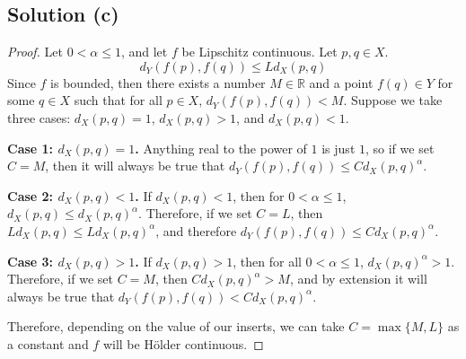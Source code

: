 \documentclass[11pt]{article}
\begin{document}
    \subsection{Solution (c)}
        \begin{proof}
            Let $0 < \alpha \leq 1$, and let $f$ be Lipschitz continuous.
            Let $p,q \in X$.
            \begin{equation}
                d_Y(f(p),f(q)) \leq Ld_X(p,q)
            \end{equation}
            Since $f$ is bounded, then there exists a number $M \in \mathbb{R}$ and a point $f(q) \in Y$ for some $q \in X$ such that for all $p \in X$, $d_Y(f(p),f(q)) < M$.
            Suppose we take three cases: $d_X(p,q) = 1$, $d_X(p,q) > 1$, and $d_X(p,q) < 1$.

            \textbf{Case 1: $d_X(p,q) = 1$.}
                Anything real to the power of $1$ is just $1$, so if we set $C = M$, then it will always be true that $d_Y(f(p),f(q)) \leq C d_X(p,q)^\alpha$.

            \textbf{Case 2: $d_X(p,q) < 1$.}
                If $d_X(p,q) < 1$, then for $0 < \alpha \leq 1$, $d_X(p,q) \leq d_X(p,q)^\alpha$.
                Therefore, if we set $C = L$, then $L d_X(p,q) \leq L d_X(p,q)^\alpha$, and therefore $d_Y(f(p),f(q)) \leq C d_X(p,q)^\alpha$.

            \textbf{Case 3: $d_X(p,q) > 1$.}
                If $d_X(p,q) > 1$, then for all $0 < \alpha \leq 1$, $d_X(p,q)^\alpha > 1$.
                Therefore, if we set $C = M$, then $C d_X(p,q)^\alpha > M$, and by extension it will always be true that $d_Y(f(p),f(q)) < C d_X(p,q)^\alpha$.

            Therefore, depending on the value of our inserts, we can take $C = \max\{M,L\}$ as a constant and $f$ will be H\"older continuous.
        \end{proof}
\end{document}
